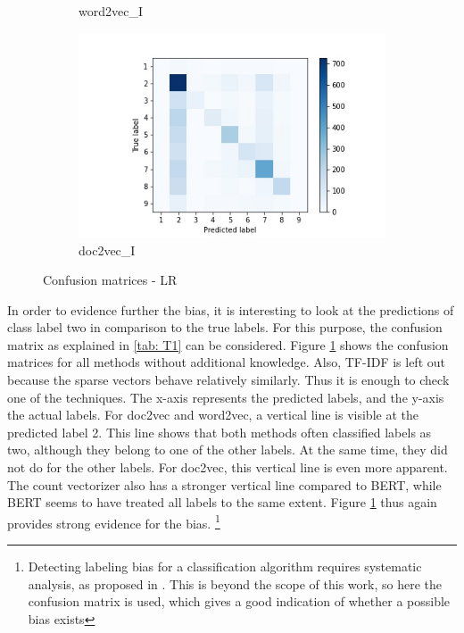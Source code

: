 \documentclass[12pt, a4paper, titlepage]{article}
\begin{document}
\begin{figure}
\begin{subfigure}[b]{0.475\textwidth}
    {{\small word2vec\_I}}    
  \end{subfigure}
  \hfill
  \begin{subfigure}[b]{0.475\textwidth}   
      \centering 
      \includegraphics[width=\textwidth]{cm_doc2vec_without_LR.jpg}
      {{\small doc2vec\_I}}    
  \end{subfigure}
  \caption{\label{fig: F17} Confusion matrices - \ac{LR}}
\end{figure}

In order to evidence further the bias, it is interesting to look at the predictions of class label two in comparison to the true labels. For this purpose, the confusion matrix as explained in \ref{tab: T1} can be considered. Figure \ref{fig: F17} shows the confusion matrices for all methods without additional knowledge. Also, \ac{TF-IDF} is left out because the sparse vectors behave relatively similarly. Thus it is enough to check one of the techniques. The x-axis represents the predicted labels, and the y-axis the actual labels. For doc2vec and word2vec, a vertical line is visible at the predicted label 2. This line shows that both methods often classified labels as two, although they belong to one of the other labels. At the same time, they did not do for the other labels. For doc2vec, this vertical line is even more apparent. The count vectorizer also has a stronger vertical line compared to BERT, while BERT seems to have treated all labels to the same extent. Figure \ref{fig: F17} thus again provides strong evidence for the bias. \footnote{Detecting labeling bias for a classification algorithm requires systematic analysis, as proposed in \citet{jiang2020}. This is beyond the scope of this work, so here the confusion matrix is used, which gives a good indication of whether a possible bias exists}
\end{document}

